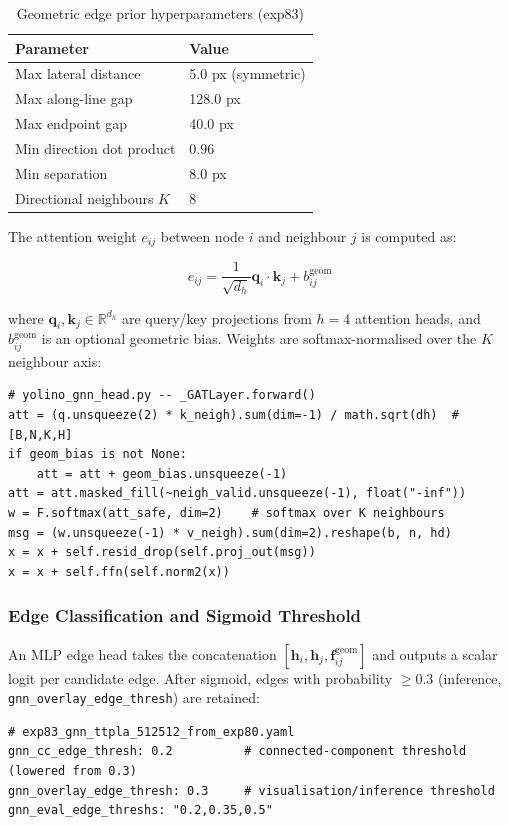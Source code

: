 \documentclass[11pt,a4paper]{article}
\begin{document}
\begin{table}[H]
\centering
\caption{Geometric edge prior hyperparameters (exp83)}
\begin{tabular}{ll}
\toprule
Parameter & Value \\
\midrule
Max lateral distance & 5.0 px (symmetric) \\
Max along-line gap & 128.0 px \\
Max endpoint gap & 40.0 px \\
Min direction dot product & 0.96 \\
Min separation & 8.0 px \\
Directional neighbours $K$ & 8 \\
\bottomrule
\end{tabular}
\end{table}

The attention weight $e_{ij}$ between node $i$ and neighbour $j$ is computed as:

\[
e_{ij} = \frac{1}{\sqrt{d_h}} \mathbf{q}_i \cdot \mathbf{k}_j + b_{ij}^{\text{geom}}
\]

where $\mathbf{q}_i, \mathbf{k}_j \in \mathbb{R}^{d_h}$ are query/key projections from
$h = 4$ attention heads, and $b_{ij}^{\text{geom}}$ is an optional geometric bias.
Weights are softmax-normalised over the $K$ neighbour axis:

\begin{lstlisting}
# yolino_gnn_head.py -- _GATLayer.forward()
att = (q.unsqueeze(2) * k_neigh).sum(dim=-1) / math.sqrt(dh)  # [B,N,K,H]
if geom_bias is not None:
    att = att + geom_bias.unsqueeze(-1)
att = att.masked_fill(~neigh_valid.unsqueeze(-1), float("-inf"))
w = F.softmax(att_safe, dim=2)    # softmax over K neighbours
msg = (w.unsqueeze(-1) * v_neigh).sum(dim=2).reshape(b, n, hd)
x = x + self.resid_drop(self.proj_out(msg))
x = x + self.ffn(self.norm2(x))
\end{lstlisting}

\subsubsection{Edge Classification and Sigmoid Threshold}

An MLP edge head takes the concatenation $[\mathbf{h}_i, \mathbf{h}_j,
\mathbf{f}_{ij}^{\text{geom}}]$ and outputs a scalar logit per candidate edge.
After sigmoid, edges with probability $\geq 0.3$ (inference, \texttt{gnn\_overlay\_edge\_thresh})
are retained:

\begin{lstlisting}
# exp83_gnn_ttpla_512512_from_exp80.yaml
gnn_cc_edge_thresh: 0.2          # connected-component threshold (lowered from 0.3)
gnn_overlay_edge_thresh: 0.3     # visualisation/inference threshold
gnn_eval_edge_threshs: "0.2,0.35,0.5"
\end{lstlisting}
\end{document}
